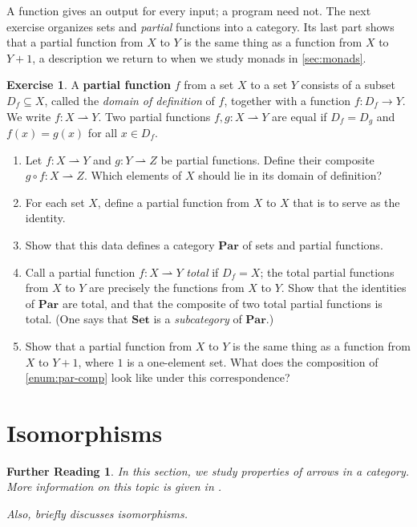 \documentclass[a4paper,11pt, oneside,titlepage=false]{scrbook}
\theoremstyle{plain}
\newtheorem*{reading*}{Further Reading}
\theoremstyle{definition}
\newtheorem{exer}[thm]{Exercise}
\newcommand{\Catb}[1]{\mathbf{#1}}
\newcommand{\SET}{\Catb{Set}}
\newcommand{\PAR}{\Catb{Par}}
\newcommand{\co}[2]{\ensuremath{#2 \circ #1}}
\begin{document}
A function gives an output for every input; a program need not.
The next exercise organizes sets and \emph{partial} functions into a category.
Its last part shows that a partial function from $X$ to $Y$ is the same thing as
a function from $X$ to $Y + 1$, a description we return to when we study monads
in \cref{sec:monads}.

\begin{exer}\label{exer:category_of_partial_functions}
  A \textbf{partial function} $f$ from a set $X$ to a set $Y$ consists of a
  subset $D_f \subseteq X$, called the \emph{domain of definition} of $f$,
  together with a function $f : D_f \to Y$.
  We write $f : X \rightharpoonup Y$.
  Two partial functions $f, g : X \rightharpoonup Y$ are equal if $D_f = D_g$
  and $f(x) = g(x)$ for all $x \in D_f$.
  \begin{enumerate}
  \item \label{enum:par-comp}
    Let $f : X \rightharpoonup Y$ and $g : Y \rightharpoonup Z$ be partial
    functions. Define their composite $\co{f}{g} : X \rightharpoonup Z$.
    Which elements of $X$ should lie in its domain of definition?
  \item For each set $X$, define a partial function from $X$ to $X$ that is to
    serve as the identity.
  \item Show that this data defines a category $\PAR$ of sets and partial
    functions.
  \item Call a partial function $f : X \rightharpoonup Y$ \emph{total} if
    $D_f = X$; the total partial functions from $X$ to $Y$ are precisely the
    functions from $X$ to $Y$.
    Show that the identities of $\PAR$ are total, and that the composite of two
    total partial functions is total.
    (One says that $\SET$ is a \emph{subcategory} of $\PAR$.)
  \item Show that a partial function from $X$ to $Y$ is the same thing as a
    function from $X$ to $Y + 1$, where $1$ is a one-element set.
    What does the composition of \cref{enum:par-comp} look like under this
    correspondence?
  \end{enumerate}
\end{exer}

\section{Isomorphisms}
\label{sec:isos}

\begin{reading*}
  In this section, we study properties of arrows in a category.
  More information on this topic is given in \cite[\S 2.7]{barr-wells}.

  Also, \cite[\S 2.2]{pierce} briefly discusses isomorphisms.
\end{reading*}
\end{document}

